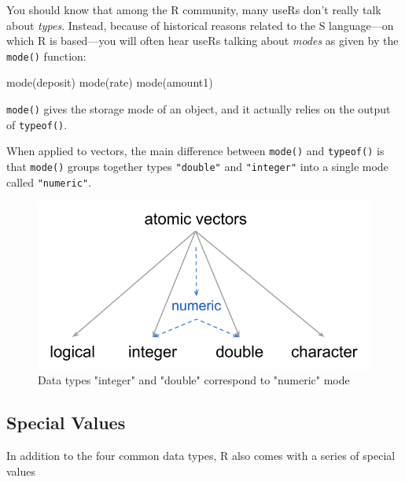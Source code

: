\documentclass[
]{book}
\newenvironment{Shaded}{\begin{snugshade}}{\end{snugshade}}
\newcommand{\FunctionTok}[1]{\textcolor[rgb]{0.00,0.00,0.00}{#1}}
\newcommand{\NormalTok}[1]{#1}
\begin{document}
You should know that among the R community, many useRs don't really talk about
\emph{types}. Instead, because of historical reasons related to the S language---on
which R is based---you will often hear useRs talking about \emph{modes} as given by
the \texttt{mode()} function:

\begin{Shaded}
\begin{Highlighting}[]
\FunctionTok{mode}\NormalTok{(deposit)}
\FunctionTok{mode}\NormalTok{(rate)}
\FunctionTok{mode}\NormalTok{(amount1)}
\end{Highlighting}
\end{Shaded}

\texttt{mode()} gives the storage mode of an object, and it actually relies on the
output of \texttt{typeof()}.

When applied to vectors, the main difference between \texttt{mode()} and \texttt{typeof()} is
that \texttt{mode()} groups together types \texttt{"double"} and \texttt{"integer"} into a single
mode called \texttt{"numeric"}.

\begin{figure}

{\centering \includegraphics[width=0.55\linewidth]{images/objects/obj-vector-atomic-modes} 

}

\caption{Data types "integer" and "double" correspond to "numeric" mode}\label{fig:unnamed-chunk-48}
\end{figure}

\hypertarget{special-values}{%
\subsection{Special Values}\label{special-values}}

In addition to the four common data types, R also comes with a series of
special values
\end{document}
